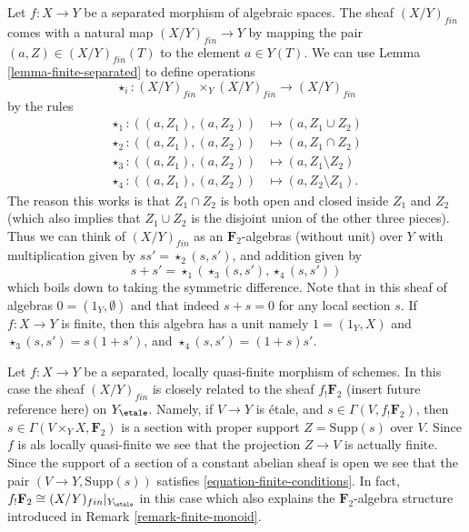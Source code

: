 \begin{remark}
\label{remark-finite-monoid}
Let $f : X \to Y$ be a separated morphism of algebraic spaces.
The sheaf $(X/Y)_{fin}$ comes with a natural map
$(X/Y)_{fin} \to Y$ by mapping the pair $(a, Z) \in (X/Y)_{fin}(T)$
to the element $a \in Y(T)$. We can use
Lemma \ref{lemma-finite-separated}
to define operations
$$
\star_i : (X/Y)_{fin} \times_Y (X/Y)_{fin} \longrightarrow (X/Y)_{fin}
$$
by the rules
\begin{align*}
\star_1 : ((a, Z_1), (a, Z_2)) & \longmapsto (a, Z_1 \cup Z_2) \\
\star_2 : ((a, Z_1), (a, Z_2)) & \longmapsto (a, Z_1 \cap Z_2) \\
\star_3 : ((a, Z_1), (a, Z_2)) & \longmapsto (a, Z_1 \setminus Z_2) \\
\star_4 : ((a, Z_1), (a, Z_2)) & \longmapsto (a, Z_2 \setminus Z_1).
\end{align*}
The reason this works is that $Z_1 \cap Z_2$ is both open and closed
inside $Z_1$ and $Z_2$ (which also implies that $Z_1 \cup Z_2$ is
the disjoint union of the other three pieces).
Thus we can think of $(X/Y)_{fin}$ as an $\mathbf{F}_2$-algebras
(without unit) over $Y$ with multiplication given by
$ss' = \star_2(s, s')$, and addition given by
$$
s + s' = \star_1(\star_3(s, s'), \star_4(s, s'))
$$
which boils down to taking the symmetric difference.
Note that in this sheaf of algebras $0 = (1_Y, \emptyset)$
and that indeed $s + s = 0$ for any local section $s$.
If $f : X \to Y$ is finite, then this algebra has a unit namely
$1 = (1_Y, X)$ and $\star_3(s, s') = s(1 + s')$, and
$\star_4(s, s') = (1 + s)s'$.
\end{remark}

\begin{remark}
\label{remark-finite-quasi-finite-separated-morphism-schemes}
Let $f : X \to Y$ be a separated, locally quasi-finite
morphism of schemes. In this case the sheaf $(X/Y)_{fin}$
is closely related to the sheaf $f_!\mathbf{F}_2$
(insert future reference here) on $Y_\etale$.
Namely, if $V \to Y$ is \'etale, and $s \in \Gamma(V, f_!\mathbf{F}_2)$,
then $s \in \Gamma(V \times_Y X, \mathbf{F}_2)$ is a section
with proper support $Z = \text{Supp}(s)$ over $V$. Since $f$ is
als locally quasi-finite we see that the projection $Z \to V$ is actually
finite. Since the support of a section of a constant abelian sheaf is open
we see that the pair $(V \to Y, \text{Supp}(s))$ satisfies
\ref{equation-finite-conditions}.
In fact, $f_!\mathbf{F}_2 \cong (X/Y)_{fin}|_{Y_\etale}$
in this case which also explains the $\mathbf{F}_2$-algebra structure
introduced in Remark \ref{remark-finite-monoid}.
\end{remark}

